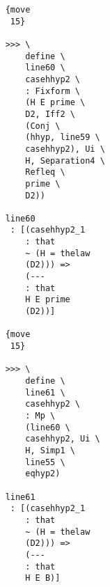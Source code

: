\documentclass[12pt]{article}
\begin{document}
\begin{verbatim}
                                                {move 
                                                 15}

                                                >>> \
                                                    define \
                                                    line60 \
                                                    casehhyp2 \
                                                    : Fixform \
                                                    (H E prime \
                                                    D2, Iff2 \
                                                    (Conj \
                                                    (hhyp, line59 \
                                                    casehhyp2), Ui \
                                                    H, Separation4 \
                                                    Refleq \
                                                    prime \
                                                    D2))

                                                line60 
                                                 : [(casehhyp2_1 
                                                    : that 
                                                    ~ (H = thelaw 
                                                    (D2))) => 
                                                    (--- 
                                                    : that 
                                                    H E prime 
                                                    (D2))]

                                                {move 
                                                 15}

                                                >>> \
                                                    define \
                                                    line61 \
                                                    casehhyp2 \
                                                    : Mp \
                                                    (line60 \
                                                    casehhyp2, Ui \
                                                    H, Simp1 \
                                                    line55 \
                                                    eqhyp2)

                                                line61 
                                                 : [(casehhyp2_1 
                                                    : that 
                                                    ~ (H = thelaw 
                                                    (D2))) => 
                                                    (--- 
                                                    : that 
                                                    H E B)]


\end{verbatim}
\end{document}
